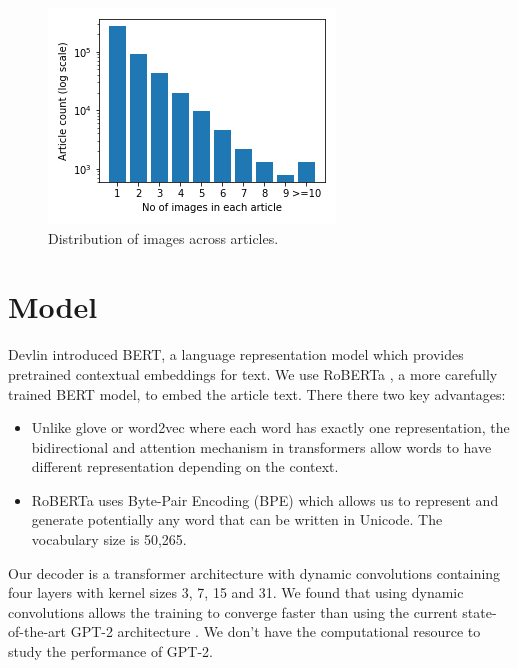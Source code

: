 \documentclass[10pt,twocolumn,letterpaper]{article}
\begin{document}
\begin{figure}[h]
   \begin{center}
   \includegraphics[width=0.8\linewidth]{figures/caption_dist.png}
   \end{center}
      \caption{Distribution of images across articles.}
   \label{fig:dist}
   \end{figure}




\section{Model}

Devlin \etal \cite{Devlin2019BERT} introduced BERT, a language representation
model which provides pretrained contextual embeddings for text. We use
RoBERTa \cite{Liu2019RoBERTaAR}, a more carefully trained BERT model, to
embed the article text. There there two key advantages:

\begin{itemize}
   \item Unlike glove \cite{Pennington2014Glove} or word2vec
   \cite{Mikolov2013DistributedRO} where each word has exactly one
   representation, the bidirectional and attention mechanism in transformers
   allow words to have different representation depending on the context.
   \item RoBERTa uses Byte-Pair Encoding (BPE)
   \cite{Sennrich2015NeuralMT,Radford2019LanguageMA} which allows us to
   represent and generate potentially any word that can be written in
   Unicode. The vocabulary size is 50,265.
\end{itemize}

Our decoder is a transformer architecture with dynamic convolutions
\cite{Wu2018PayLA} containing four layers with kernel sizes 3, 7, 15 and 31. We
found that using dynamic convolutions allows the training to converge faster
than using the current state-of-the-art GPT-2 architecture
\cite{Radford2019LanguageMA}. We don't have the computational resource to study
the performance of GPT-2.
\end{document}
